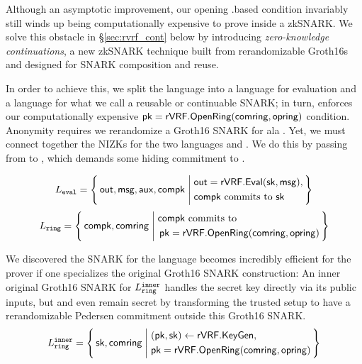 Although an asymptotic improvement, our opening \rVRF.\OpenRing based condition invariably
still winds up being computationally expensive to prove inside a zkSNARK.
We solve this obstacle in \S\ref{sec:rvrf_cont} below by introducing
{\em zero-knowledge continuations}, a new zkSNARK technique built from
rerandomizable Groth16s \cite{Groth16} and designed for SNARK composition and reuse.

In order to achieve this, we split the language \Lrvrf into
a language \Leval for \rVRF evaluation and a language
\Lring for what we call a reusable or continuable SNARK; in turn, \Lring enforces our computationally 
expensive $\mathsf{pk} = {\mathsf{rVRF}}.{\mathsf{OpenRing}}(\mathsf{comring},\mathsf{opring})$ condition.  Anonymity requires we rerandomize a Groth16 SNARK for \Lring
ala \cite[Theorem 3, Appendix C, pp. 31]{RandomizationGroth16}.
%
Yet, we must connect together the NIZKs for the two languages  \Leval and \Lring. We do this by passing \pk from \Lring to \Leval, which
demands some hiding commitment \compk to \pk.

%
\def\tmpAA{\Out = \rVRF.\Eval(\sk,\msg)}%
\def\tmpBB{\textrm{\compk commits to\ \sk}}%
$$ \Leval = \Setst{ \Out, \msg, \aux, \compk }{
	\eprint{
	\tmpAA, \, \tmpBB
    }{
	\begin{aligned}
	&\tmpAA, \\
	&\tmpBB \\
	\end{aligned}
    }
} $$
\def\tmpAA{\textrm{\compk commits to\ }}%
\def\tmpBB{\rVRF.\OpenRing(\comring,\openring)}%
$$ \Lring = \Setst{ \compk, \comring }{
	\eprint{
	\tmpAA \pk = \tmpBB
	}{
    \begin{aligned}
	&\tmpAA \\
	&\, \pk = \tmpBB \\
    \end{aligned}
	}
} $$

We discovered the SNARK for the language \Lring becomes incredibly efficient for the prover if one specializes
the original Groth16 SNARK construction:  An inner original Groth16 SNARK for $L_{\mathtt{ring}}^{\mathtt{inner}}$
handles the secret key \sk directly via its public inputs, but
\sk and even \pk remain secret by transforming the trusted setup to have
a rerandomizable Pedersen commitment \compk outside this Groth16 SNARK.
$$ \Lring^\inner = \Setst{ \sk, \comring}{
    \eprint{
    (\pk,\sk) \leftarrow \rVRF.\KeyGen, \, %
    \pk = \rVRF.\OpenRing(\comring,\openring) 
    }{
    \begin{aligned}
        &(\pk,\sk) \leftarrow \rVRF.\KeyGen, \\
        &\pk = \rVRF.\OpenRing(\comring,\openring)  \\      
    \end{aligned}
    }
} $$

